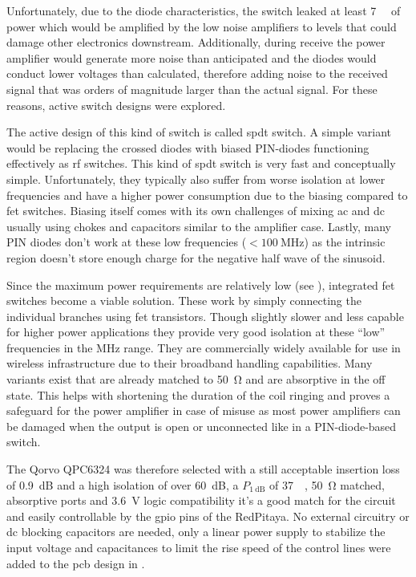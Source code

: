 Unfortunately, due to the diode characteristics, the switch leaked at least \qty{7}{\deci\belm} of power which would be amplified by the low noise amplifiers to levels that could damage other electronics downstream. Additionally, during receive the power amplifier would generate more noise than anticipated and the diodes would conduct lower voltages than calculated, therefore adding noise to the received signal that was orders of magnitude larger than the actual signal. For these reasons, active switch designs were explored.

The active design of this kind of switch is called \acrfull{spdt} switch. A simple variant would be replacing the crossed diodes with biased PIN-diodes functioning effectively as \acrshort{rf} switches. This kind of \acrshort{spdt} switch is very fast and conceptually simple. Unfortunately, they typically also suffer from worse isolation at lower frequencies and have a higher power consumption due to the biasing compared to \acrshort{fet} switches. Biasing itself comes with its own challenges of mixing \acrshort{ac} and \acrshort{dc} usually using chokes and capacitors similar to the amplifier case. Lastly, many PIN diodes don't work at these low frequencies (\(<\qty{100}{\mega\hertz}\)) as the intrinsic region doesn't store enough charge for the negative half wave of the sinusoid.

Since the maximum power requirements are relatively low (see ), integrated \acrshort{fet} switches become a viable solution. These work by simply connecting the individual branches using \acrshort{fet} transistors. Though slightly slower and less capable for higher power applications they provide very good isolation at these \enquote{low} frequencies in the \unit{\mega\hertz} range. They are commercially widely available for use in wireless infrastructure due to their broadband handling capabilities. Many variants exist that are already matched to \qty{50}{\ohm} and are absorptive in the off state. This helps with shortening the duration of the coil ringing and proves a safeguard for the power amplifier in case of misuse as most power amplifiers can be damaged when the output is open or unconnected like in a PIN-diode-based switch.

The Qorvo QPC6324 was therefore selected with a still acceptable insertion loss of \qty{0.9}{\deci\bel} and a high isolation of over \qty{60}{\deci\bel}, a \(P_{\qty{1}{\deci\bel}}\) of \qty{37}{\deci\belm}, \qty{50}{\ohm} matched, absorptive ports and \qty{3.6}{\volt} logic compatibility it's a good match for the circuit and easily controllable by the \acrfull{gpio} pins of the RedPitaya. No external circuitry or \acrshort{dc} blocking capacitors are needed, only a linear power supply to stabilize the input voltage and capacitances to limit the rise speed of the control lines were added to the \acrshort{pcb} design in .

